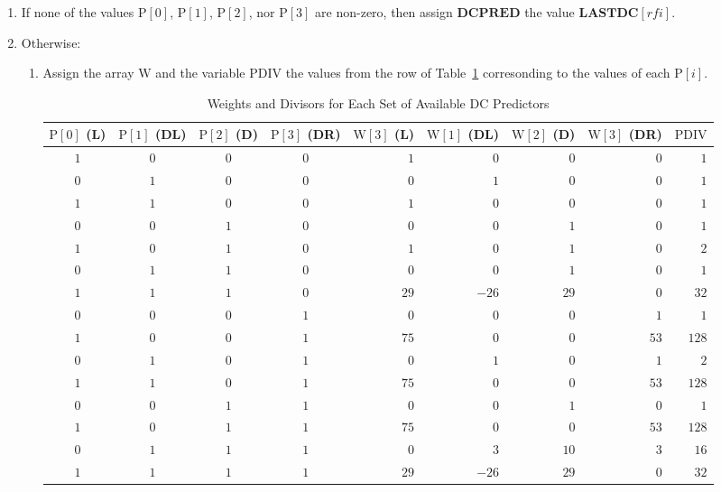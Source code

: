 \documentclass[9pt,letterpaper]{book}
\newcommand{\idx}[1]{{\ensuremath{\mathit{#1}}}}
\newcommand{\rfi}{\idx{rfi}}
\newcommand{\bitvar}[1]{\ensuremath{\mathbf{\bm{#1}}}}
\newcommand{\locvar}[1]{\ensuremath{\mathrm{#1}}}
\numberwithin{equation}{chapter}
\numberwithin{figure}{chapter}
\numberwithin{table}{chapter}
\begin{document}
\begin{enumerate}
\item
If none of the values $\locvar{P}[0]$, $\locvar{P}[1]$, $\locvar{P}[2]$, nor
 $\locvar{P}[3]$ are non-zero, then assign \bitvar{DCPRED} the value
 $\bitvar{LASTDC}[\locvar{\rfi}]$.
\item
Otherwise:
\begin{enumerate}
\item
Assign the array \locvar{W} and the variable \locvar{PDIV} the values from the
 row of Table~\ref{tab:dc-weights} corresonding to the values of each
 $\locvar{P}[\idx{i}]$.

\begin{table}[htb]
\begin{center}
\begin{tabular}{ccccrrrrr}\toprule
\multicolumn{1}{p{25pt}}{\centering$\locvar{P}[0]$ (L)} &
\multicolumn{1}{p{25pt}}{\centering$\locvar{P}[1]$ (DL)} &
\multicolumn{1}{p{25pt}}{\centering$\locvar{P}[2]$ (D)} &
\multicolumn{1}{p{25pt}}{\centering$\locvar{P}[3]$ (DR)} &
\multicolumn{1}{p{25pt}}{\centering$\locvar{W}[3]$ (L)} &
\multicolumn{1}{p{25pt}}{\centering$\locvar{W}[1]$ (DL)} &
\multicolumn{1}{p{25pt}}{\centering$\locvar{W}[2]$ (D)} &
\multicolumn{1}{p{25pt}}{\centering$\locvar{W}[3]$ (DR)} &
\locvar{PDIV} \\\midrule
$1$ & $0$ & $0$ & $0$ &  $1$ &   $0$ &  $0$ &  $0$ &   $1$ \\
$0$ & $1$ & $0$ & $0$ &  $0$ &   $1$ &  $0$ &  $0$ &   $1$ \\
$1$ & $1$ & $0$ & $0$ &  $1$ &   $0$ &  $0$ &  $0$ &   $1$ \\
$0$ & $0$ & $1$ & $0$ &  $0$ &   $0$ &  $1$ &  $0$ &   $1$ \\
$1$ & $0$ & $1$ & $0$ &  $1$ &   $0$ &  $1$ &  $0$ &   $2$ \\
$0$ & $1$ & $1$ & $0$ &  $0$ &   $0$ &  $1$ &  $0$ &   $1$ \\
$1$ & $1$ & $1$ & $0$ & $29$ & $-26$ & $29$ &  $0$ &  $32$ \\
$0$ & $0$ & $0$ & $1$ &  $0$ &   $0$ &  $0$ &  $1$ &   $1$ \\
$1$ & $0$ & $0$ & $1$ & $75$ &   $0$ &  $0$ & $53$ & $128$ \\
$0$ & $1$ & $0$ & $1$ &  $0$ &   $1$ &  $0$ &  $1$ &   $2$ \\
$1$ & $1$ & $0$ & $1$ & $75$ &   $0$ &  $0$ & $53$ & $128$ \\
$0$ & $0$ & $1$ & $1$ &  $0$ &   $0$ &  $1$ &  $0$ &   $1$ \\
$1$ & $0$ & $1$ & $1$ & $75$ &   $0$ &  $0$ & $53$ & $128$ \\
$0$ & $1$ & $1$ & $1$ &  $0$ &   $3$ & $10$ &  $3$ &  $16$ \\
$1$ & $1$ & $1$ & $1$ & $29$ & $-26$ & $29$ &  $0$ &  $32$ \\
\bottomrule\end{tabular}
\end{center}
\caption{Weights and Divisors for Each Set of Available DC Predictors}
\label{tab:dc-weights}
\end{table}


\end{enumerate}
\end{enumerate}
\end{document}

